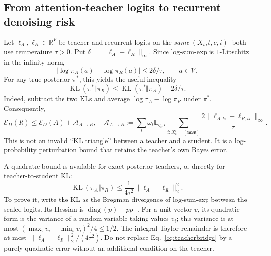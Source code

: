 \documentclass{article}
\theoremstyle{remark}\newtheorem{remark}[theorem]{Remark}
\newcommand{\R}{\mathbb R}
\newcommand{\E}{\mathbb E}
\newcommand{\diag}{\operatorname{diag}}
\newcommand{\KL}{\operatorname{KL}}
\newcommand{\mask}{\mathtt{[MASK]}}
\begin{document}
\subsection{From attention-teacher logits to recurrent denoising risk}
Let $\ell_A,\ell_R\in\R^V$ be teacher and recurrent logits on the \emph{same} $(X_t,t,c,i)$; both use temperature $\tau>0$. Put $\delta=\|\ell_A-\ell_R\|_\infty$. Since log-sum-exp is $1$-Lipschitz in the infinity norm,
\begin{equation}
 \left|\log\pi_A(a)-\log\pi_R(a)\right|\le 2\delta/\tau,
 \qquad a\in\mathcal V.
 \label{eq:logprobperturb}
\end{equation}
For any true posterior $\pi^*$, this yields the useful inequality
\begin{equation}
 \KL(\pi^*\Vert\pi_R)
 \le\KL(\pi^*\Vert\pi_A)+2\delta/\tau.
 \label{eq:teacherbridge}
\end{equation}
Indeed, subtract the two KLs and average $\log\pi_A-\log\pi_R$ under $\pi^*$. Consequently,
\begin{equation}
 \mathcal E_D(R)\le\mathcal E_D(A)+\mathcal A_{A\to R},\quad
 \mathcal A_{A\to R}:=\sum_t\omega_t\E_{q_t,c}
 \sum_{i:X_t^i=\mask}\frac{2\|\ell_{A,ti}-\ell_{R,ti}\|_\infty}{\tau}.
 \label{eq:teacherriskbridge}
\end{equation}
This is not an invalid ``KL triangle'' between a teacher and a student. It is a log-probability perturbation bound that retains the teacher's own Bayes error.

A quadratic bound is available for exact-posterior teachers, or directly for teacher-to-student KL:
\begin{equation}
 \KL(\pi_A\Vert\pi_R)\le\frac{1}{4\tau^2}\|\ell_A-\ell_R\|_2^2.
 \label{eq:softmaxquadratic}
\end{equation}
To prove it, write the KL as the Bregman divergence of log-sum-exp between the scaled logits. Its Hessian is $\diag(p)-pp^\top$. For a unit vector $v$, its quadratic form is the variance of a random variable taking values $v_i$; this variance is at most $(\max_i v_i-\min_i v_i)^2/4\le1/2$. The integral Taylor remainder is therefore at most $\|\ell_A-\ell_R\|_2^2/(4\tau^2)$. Do not replace Eq.~\eqref{eq:teacherbridge} by a purely quadratic error without an additional condition on the teacher.
\end{document}
